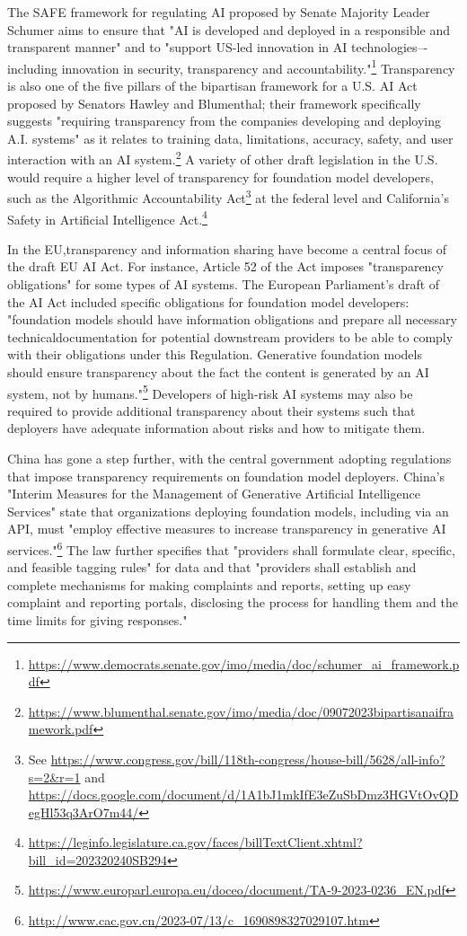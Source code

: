 The SAFE framework for regulating AI proposed by Senate Majority Leader Schumer aims to ensure that "AI is developed and deployed in a responsible and transparent manner" and to "support US-led innovation in AI technologies–-including innovation in security, transparency and accountability."\footnote{\url{https://www.democrats.senate.gov/imo/media/doc/schumer_ai_framework.pdf}}
Transparency is also one of the five pillars of the bipartisan framework for a U.S. AI Act proposed by Senators Hawley and Blumenthal; their framework specifically suggests "requiring transparency from the companies developing and deploying A.I. systems" as it relates to training data, limitations, accuracy, safety, and user interaction with an AI system.\footnote{\url{https://www.blumenthal.senate.gov/imo/media/doc/09072023bipartisanaiframework.pdf}}
A variety of other draft legislation in the U.S. would require a higher level of transparency for foundation model developers, such as the Algorithmic Accountability Act\footnote{See \url{https://www.congress.gov/bill/118th-congress/house-bill/5628/all-info?s=2&r=1} and \url{https://docs.google.com/document/d/1A1bJ1mkIfE3eZuSbDmz3HGVtOvQDegHl53q3ArO7m44/}} at the federal level and California's Safety in Artificial Intelligence Act.\footnote{\url{https://leginfo.legislature.ca.gov/faces/billTextClient.xhtml?bill_id=202320240SB294}} 


In the EU,transparency and information sharing have become a central focus of the draft EU AI Act. 
For instance, Article 52 of the Act imposes "transparency obligations" for some types of AI systems.
The European Parliament's draft of the AI Act included specific obligations for foundation model developers: "foundation models should have information obligations and prepare all necessary technicaldocumentation for potential downstream providers to be able to comply with their obligations under this Regulation. Generative foundation models should ensure transparency about the fact the content is generated by an AI system, not by humans."\footnote{\url{https://www.europarl.europa.eu/doceo/document/TA-9-2023-0236_EN.pdf}}
Developers of high-risk AI systems may also be required to provide additional transparency about their systems such that deployers have adequate information about risks and how to mitigate them.

China has gone a step further, with the central government adopting regulations that impose transparency requirements on foundation model deployers. 
China's "Interim Measures for the Management of Generative Artificial Intelligence Services" state that organizations deploying foundation models, including via an API, must "employ effective measures to increase transparency in generative AI services."\footnote{\url{http://www.cac.gov.cn/2023-07/13/c_1690898327029107.htm}} 
The law further specifies that "providers shall formulate clear, specific, and feasible tagging rules" for data and that "providers shall establish and complete mechanisms for making complaints and reports, setting up easy complaint and reporting portals, disclosing the process for handling them and the time limits for giving responses."

